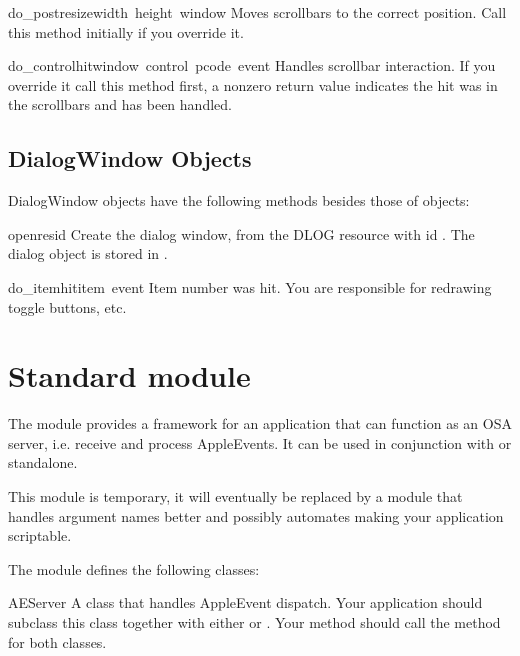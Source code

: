 \begin{funcdesc}{do_postresize}{width\, height\, window}
Moves scrollbars to the correct position. Call this method initially
if you override it.
\end{funcdesc}

\begin{funcdesc}{do_controlhit}{window\, control\, pcode\, event}
Handles scrollbar interaction. If you override it call this method
first, a nonzero return value indicates the hit was in the scrollbars
and has been handled.
\end{funcdesc}

\subsection{DialogWindow Objects}

DialogWindow objects have the following methods besides those of
 objects:

\renewcommand{\indexsubitem}{(DialogWindow method)}

\begin{funcdesc}{open}{resid}
Create the dialog window, from the DLOG resource with id
. The dialog object is stored in .
\end{funcdesc}

\begin{funcdesc}{do_itemhit}{item\, event}
Item number  was hit. You are responsible for redrawing
toggle buttons, etc.
\end{funcdesc}

\section{Standard module }

The module  provides a framework for an application
that can function as an OSA server, i.e. receive and process
AppleEvents. It can be used in conjunction with  or
standalone.

This module is temporary, it will eventually be replaced by a module
that handles argument names better and possibly automates making your
application scriptable.

The  module defines the following classes:

\renewcommand{\indexsubitem}{(in module MiniAEFrame)}

\begin{funcdesc}{AEServer}{}
A class that handles AppleEvent dispatch. Your application should
subclass this class together with either
 or
. Your  method should call
the  method for both classes.
\end{funcdesc}

